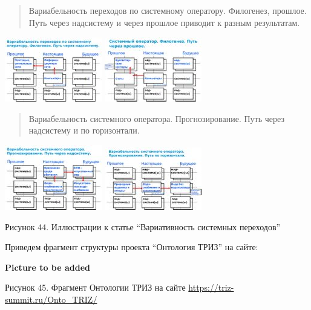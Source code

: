 \documentclass[11pt,a4paper]{article}
\newcommand{\addpicture}{\textbf{Picture to be added}\par}
\begin{document}
\begin{center}
  \begin{quote}
    Вариабельность переходов по системному оператору. Филогенез, прошлое. Путь
    через надсистему и через прошлое приводит к разным результатам. 
  \end{quote}
  \includegraphics[width=.4\textwidth]{44-1.jpeg}\hfill 
  \includegraphics[width=.4\textwidth]{44-2.jpeg} 
  \begin{quote}
    Вариабельность системного оператора. Прогнозирование. Путь через надсистему и
    по горизонтали. 
  \end{quote}
  \includegraphics[width=.4\textwidth]{44-3.jpeg}\hfill 
  \includegraphics[width=.4\textwidth]{44-4.jpeg} 
 
  Рисунок 44. Иллюстрации к статье “Вариативность системных переходов”
\end{center}
Приведем фрагмент структуры проекта “Онтология ТРИЗ” на сайте:
\begin{center}
  \addpicture
  Рисунок 45. Фрагмент Онтологии ТРИЗ на сайте
  \url{https://triz-summit.ru/Onto_TRIZ/}
\end{center}
\end{document}
